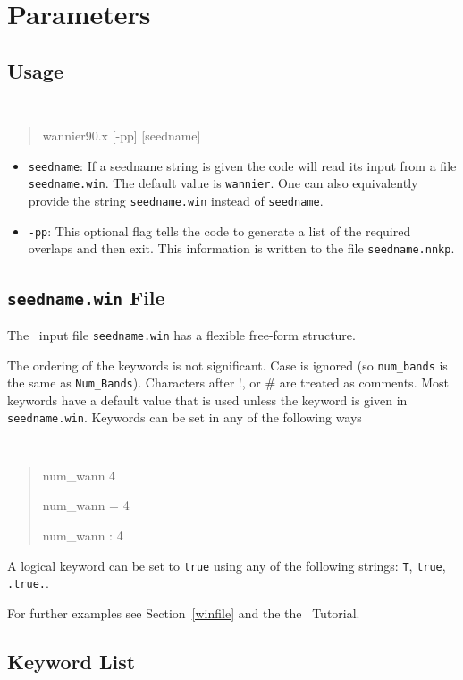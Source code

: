 \chapter{Parameters}\label{chap:parameters}

\section{Usage}
{\tt
\begin{quote}
wannier90.x [-pp] [seedname]
\end{quote} }
\begin{itemize}
\item{ {\tt seedname}: If a seedname string is given the code will read its input
from a file {\tt seedname.win}. The default value is {\tt wannier}. One can also equivalently provide the string
  {\tt seedname.win} instead of  {\tt seedname}.}
\item { {\tt -pp}: This optional flag tells the code to generate
a list of the required overlaps and then exit. 
This information is written to the file {\tt seedname.nnkp}.}
\end{itemize}

\section{{\tt seedname.win} File\label{sec:seednamefile}}
The \wannier\ input file {\tt seedname.win} has a flexible free-form
structure. 

The ordering of the keywords is not significant. Case is ignored (so
\verb#num_bands# is the same as \verb#Num_Bands#). Characters after !, or \#
are treated as comments. Most keywords have a default value that is
used unless the keyword is given in {\tt seedname.win}. Keywords can be set
in any of the following ways
{\tt
\begin{quote}
num\_wann   4

num\_wann = 4

num\_wann : 4
\end{quote} }
A logical keyword can be set to {\tt true} using any of the following
strings: {\tt T}, {\tt true}, {\tt .true.}.

For further examples see Section~\ref{winfile} and the the \wannier\ Tutorial.


\section{Keyword List}
\label{parameter_data}


